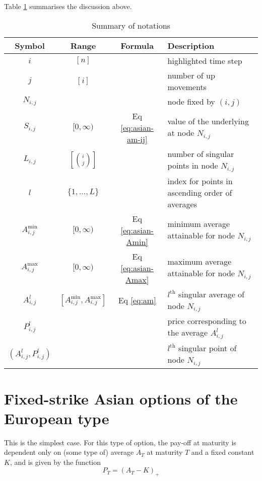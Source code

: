 Table \ref{tab:asian-notations} summarises the discussion above.

\begin{table}[h]
	\label{tab:asian-notations}
	\centering
	\caption{Summary of notations}
	\begin{tabular}{cccl}
		\toprule
		Symbol & Range & Formula & Description \\
		\midrule
		$ i $ & $ [ n ] $ & & highlighted time step \\
		$ j $ & $ [ i ] $ & & number of up movements \\
		$ N_{i,j} $ & & & node fixed by $ (i,j) $ \\
		$ S_{i,j} $ & $ [0, \infty) $ & Eq \ref{eq:asian-am-ij} & value of the underlying at node $ N_{i,j} $ \\
		$ L_{i,j} $ & $ \left[ \binom{i}{j} \right] $ & & number of singular points in node $ N_{i,j} $ \\
		$ l $ & $ \{ 1, \dots, L \} $ & & index for points in ascending order of averages \\
		$ A_{i,j}^{\min} $ & $ [0, \infty) $ & Eq \ref{eq:asian-Amin} & minimum average attainable for node $ N_{i,j} $ \\
		$ A_{i,j}^{\max} $ & $ [0, \infty) $ & Eq \ref{eq:asian-Amax} & maximum average attainable for node $ N_{i,j} $ \\
		$ A_{i,j}^l $ & $ \left[ A_{i,j}^{\min}, A_{i,j}^{\max} \right] $ & Eq \ref{eq:am} & $ l^\mathrm{th} $ singular average of node $ N_{i,j} $ \\
		$ P_{i,j}^l $ & & & price corresponding to the average $ A_{i,j}^l $ \\
		$ (A_{i,j}^l, P_{i,j}^l) $ & & & $ l^\mathrm{th} $ singular point of node $ N_{i,j} $ \\
		\bottomrule
	\end{tabular}
\end{table}



\section{Fixed-strike Asian options of the European type}
\label{sec:fixed-strike-eu}

This is the simplest case. For this type of option, the pay-off at maturity is dependent only on (some type of) average $ A_T $ at maturity $ T $ and a fixed constant $ K $, and is given by the function
\begin{equation}
	\label{eq:asian-price-eu-asian-am}
	P_T = (A_T - K)_+
\end{equation}

